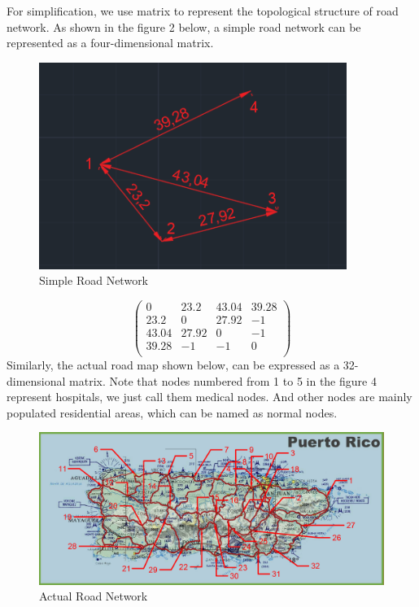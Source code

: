 \documentclass{mcmthesis}
\begin{document}
\noindent For simplification, we use matrix to represent the topological structure of road network. As shown in the figure 2 below, a simple road network can be represented as a four-dimensional matrix. 
\begin{figure}[h]
	\small
	\centering
	\includegraphics[width=10cm]{9.png}
	\caption{Simple Road Network} \label{fig:4}
\end{figure}
\[
\begin{pmatrix}
{0} & {23.2 } & {43.04 }& {39.28 }  \\
{23.2 } & {0 } & {27.92 } & {-1 } \\
{43.04 } & {27.92  } & {0 } & {-1 } \\
{39.28 } & {-1  } & {-1 } & {0 } \\
\end{pmatrix} 
\]
Similarly, the actual road map shown below, can be expressed as a 32-dimensional matrix. Note that nodes numbered from 1 to 5 in the figure 4 represent hospitals, we just call them medical nodes. And other nodes are mainly populated residential areas, which can be named as normal nodes. 
\begin{figure}[h]
	\small
	\centering
	\includegraphics[width=15cm]{6.png}
	\caption{Actual Road Network} \label{fig:4}
\end{figure}
\end{document}
